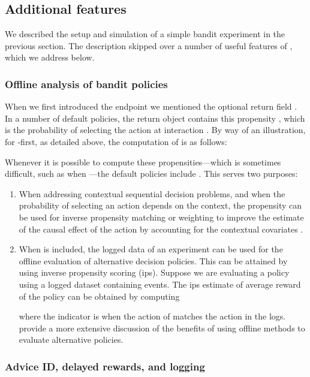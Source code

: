 \documentclass[nojss]{jss}
\begin{document}
\subsection{Additional features}

We described the setup and simulation of a simple bandit experiment in the previous section. The description skipped over a number of useful features of , which we address below.

\subsubsection{Offline analysis of bandit policies}
\label{sec:propensity}

When we first introduced the  endpoint we mentioned the optional return field . In a number of default policies, the return object contains this propensity , which is the probability of selecting the action at interaction . By way of an illustration, for -first, as detailed above, the computation of  is as follows:


Whenever it is possible to compute these propensities---which is sometimes difficult, such as when ---the default policies include . This serves two purposes:
\begin{enumerate}
\item When addressing contextual sequential decision problems, and when the probability of selecting an action depends on the context, the propensity  can be used for inverse propensity matching or weighting \citep{austin2011introduction} to improve the estimate of the causal effect of the action by accounting for the contextual covariates \citep[see, e.g.,][]{guido2015causal, pearl2009causality}.
\item When  is included, the logged data of an experiment can be used for the offline evaluation of alternative decision policies. This can be attained by using inverse propensity scoring (ips). Suppose we are evaluating a policy  using a logged dataset containing  events. The ips estimate of average reward of the policy can be obtained by computing

where the indicator is  when the action of  matches the action in the logs. \citet{agarwal2016making} provide a more extensive discussion of the benefits of using offline methods to evaluate alternative policies.
\end{enumerate}

\subsubsection{Advice ID, delayed rewards, and logging}
\label{sec:advice-id}
\end{document}
